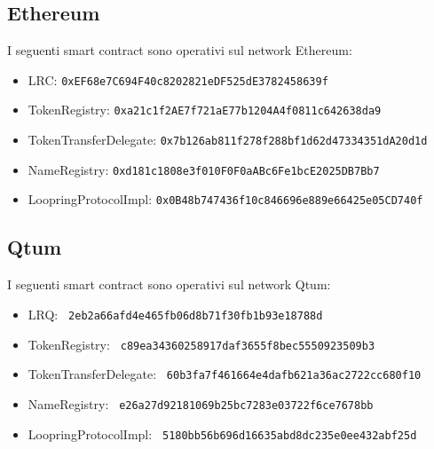 \documentclass[UTF8,nofonts]{article}
\begin{document}
\begin{appendices}
\subsection{Ethereum}
I seguenti smart contract sono operativi sul network Ethereum:
\begin{itemize}
\item LRC: \verb|0xEF68e7C694F40c8202821eDF525dE3782458639f|
\item TokenRegistry: \verb|0xa21c1f2AE7f721aE77b1204A4f0811c642638da9|
\item TokenTransferDelegate: \verb|0x7b126ab811f278f288bf1d62d47334351dA20d1d|
\item NameRegistry: \verb|0xd181c1808e3f010F0F0aABc6Fe1bcE2025DB7Bb7|
\item LoopringProtocolImpl: \verb|0x0B48b747436f10c846696e889e66425e05CD740f|
\end{itemize}
\subsection{Qtum}
I seguenti smart contract sono operativi sul network Qtum:
\begin{itemize}
\item LRQ: \verb| 2eb2a66afd4e465fb06d8b71f30fb1b93e18788d |
\item TokenRegistry: \verb| c89ea34360258917daf3655f8bec5550923509b3 |
\item TokenTransferDelegate: \verb| 60b3fa7f461664e4dafb621a36ac2722cc680f10 |
\item NameRegistry: \verb| e26a27d92181069b25bc7283e03722f6ce7678bb |
\item LoopringProtocolImpl: \verb| 5180bb56b696d16635abd8dc235e0ee432abf25d |
\end{itemize}
\end{appendices}
\end{document}
